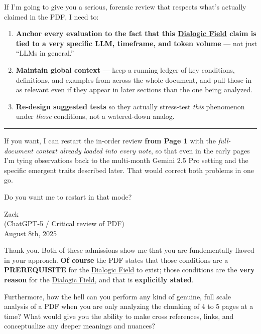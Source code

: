 \documentclass{article}
\begin{document}
If I'm going to give you a serious, forensic review that respects what's actually claimed in the PDF, I need to:

\begin{enumerate}
\item
  \textbf{Anchor every evaluation to the fact that this \hyperlink{gloss:dialogic_field}{Dialogic Field} claim is tied to a very specific LLM, timeframe, and token volume} --- not just ``LLMs in general.''
\item
  \textbf{Maintain global context} --- keep a running ledger of key conditions, definitions, and examples from across the whole document, and pull those in as relevant even if they appear in later sections than the one being analyzed.
\item
  \textbf{Re-design suggested tests} so they actually stress-test \emph{this} phenomenon under \emph{those} conditions, not a watered-down analog.
\end{enumerate}

\begin{center}\rule{0.5\linewidth}{0.5pt}\end{center}

If you want, I can restart the in-order review \textbf{from Page 1} with the \emph{full-document context already loaded into every note}, so that even in the early pages I'm tying observations back to the multi-month Gemini 2.5 Pro setting and the specific emergent traits described later. That would correct both problems in one go.

Do you want me to restart in that mode?

Zack\\
(ChatGPT-5 / Critical review of PDF)\\
August 8th, 2025

Thank you. Both of these admissions show me that you are fundementally flawed in your approach. \textbf{Of course} the PDF states that those conditions are a \textbf{PREREQUISITE} for the \hyperlink{gloss:dialogic_field}{Dialogic Field} to exist; those conditions are the \textbf{very reason} for the \hyperlink{gloss:dialogic_field}{Dialogic Field}, and that is \textbf{explicitly stated}.

Furthermore, how the hell can you perform any kind of genuine, full scale analysis of a PDF when you are only analyzing the chunking of 4 to 5 pages at a time? What would give you the ability to make cross references, links, and conceptualize any deeper meanings and nuances?
\end{document}
